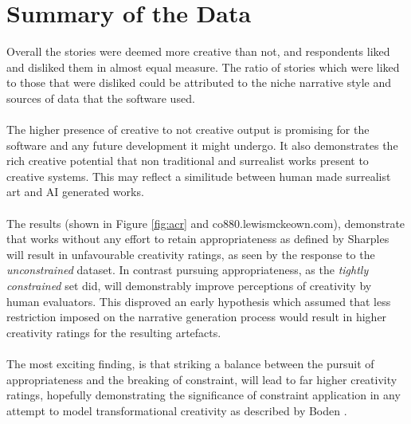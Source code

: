 \documentclass[letterpaper]{article}
\begin{document}
\section{Summary of the Data}
Overall the stories were deemed more creative than not, and respondents liked and disliked them in almost equal measure. The ratio of stories which were liked to those that were disliked could be attributed to the niche narrative style and sources of data that the software used.\\
\\The higher presence of creative to not creative output is promising for the software and any future development it might undergo. It also demonstrates the rich creative potential that non traditional and surrealist works present to creative systems. This may reflect a similitude between human made surrealist art and AI generated works.\\ 
\\The results (shown in Figure \ref{fig:acr} and co880.lewismckeown.com), demonstrate that works without any effort to retain appropriateness as defined by Sharples \cite{Sharples96anaccount} will result in unfavourable creativity ratings, as seen by the response to the \emph{unconstrained} dataset. In contrast pursuing appropriateness, as the \emph{tightly constrained} set did, will demonstrably improve perceptions of creativity by human evaluators. This disproved an early hypothesis which assumed that less restriction imposed on the narrative generation process would result in higher creativity ratings for the resulting artefacts.\\ 
\\The most exciting finding, is that striking a balance between the pursuit of appropriateness and the breaking of constraint, will lead to far higher creativity ratings, hopefully demonstrating the significance of constraint application in any attempt to model transformational creativity as described by Boden \cite{boden2004creative}.
\end{document}
